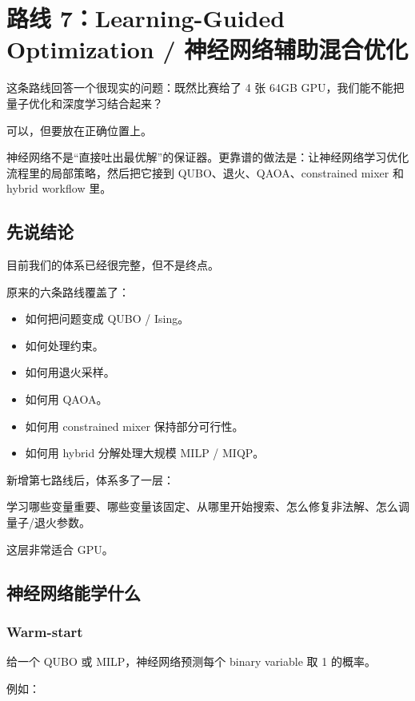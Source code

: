 \documentclass[UTF8,12pt,a4paper]{ctexart}
\begin{document}
\section*{路线 7：Learning-Guided Optimization / 神经网络辅助混合优化}

这条路线回答一个很现实的问题：既然比赛给了 4 张 64GB GPU，我们能不能把量子优化和深度学习结合起来？

可以，但要放在正确位置上。

神经网络不是“直接吐出最优解”的保证器。更靠谱的做法是：让神经网络学习优化流程里的局部策略，然后把它接到 QUBO、退火、QAOA、constrained mixer 和 hybrid workflow 里。

\subsection*{先说结论}

目前我们的体系已经很完整，但不是终点。

原来的六条路线覆盖了：

\begin{itemize}
\item 如何把问题变成 QUBO / Ising。
\item 如何处理约束。
\item 如何用退火采样。
\item 如何用 QAOA。
\item 如何用 constrained mixer 保持部分可行性。
\item 如何用 hybrid 分解处理大规模 MILP / MIQP。
\end{itemize}

新增第七路线后，体系多了一层：

\begin{GuideVerbatim}
学习哪些变量重要、哪些变量该固定、从哪里开始搜索、怎么修复非法解、怎么调量子/退火参数。
\end{GuideVerbatim}

这层非常适合 GPU。

\subsection*{神经网络能学什么}

\subsubsection*{Warm-start}

给一个 QUBO 或 MILP，神经网络预测每个 binary variable 取 1 的概率。

例如：
\end{document}
